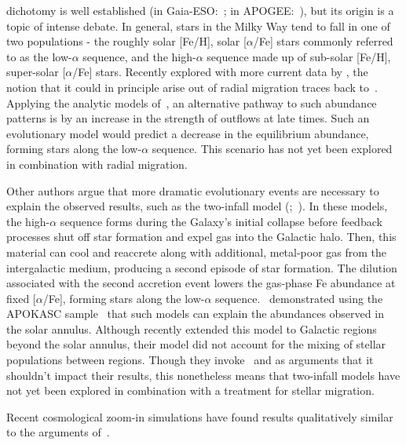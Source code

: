 \documentclass[fleqn, usenatbib]{mnras}
\begin{document}
dichotomy is well established (in Gaia-ESO:~\citealp{Recio-Blanco2014, 
Rojas-Arriagada2017}; in APOGEE:~\citealp{Nidever2014, Hayden2015, 
Weinberg2019}), but its origin is a topic of intense debate. In general, stars 
in the Milky Way tend to fall in one of two populations - the roughly solar 
[Fe/H], solar [$\alpha$/Fe] stars commonly referred to as the low-$\alpha$ 
sequence, and the high-$\alpha$ sequence made up of sub-solar [Fe/H], 
super-solar [$\alpha$/Fe] stars. Recently explored with more current data by 
\citet{Sharma2020}, the notion that it could in principle arise out of radial 
migration traces back to~\citet{Schoenrich2009}. Applying the analytic models 
of~\citet{Weinberg2017}, an alternative pathway to such abundance patterns is 
by an increase in the strength of outflows at late times. Such an evolutionary 
model would predict a decrease in the equilibrium abundance, forming stars 
along the low-$\alpha$ sequence. This scenario has not yet been explored in 
combination with radial migration. 
\par 
Other authors argue that more dramatic evolutionary events are necessary to 
explain the observed results, such as the two-infall model 
(\citealp*{Chiappini1997, Chiappini2001};~\citealp{Romano2010, Grisoni2017, 
Noguchi2018, Palla2020, Spitoni2016, Spitoni2018}). 
In these models, the high-$\alpha$ sequence forms during the Galaxy's initial 
collapse before feedback processes shut off star formation and expel gas into 
the Galactic halo. Then, this material can cool and reaccrete along with 
additional, metal-poor gas from the intergalactic medium, producing a second 
episode of star formation. The dilution associated with the second accretion 
event lowers the gas-phase Fe abundance at fixed [$\alpha$/Fe], forming stars 
along the low-$\alpha$ sequence.~\citet{Spitoni2019a, Spitoni2020} demonstrated 
using the APOKASC sample~\citep{Pinsonneault2014, SilvaAguirre2018} that such 
models can explain the abundances observed in the solar annulus. Although 
\citet{Spitoni2021} recently extended this model to Galactic regions beyond 
the solar annulus, their model did not account for the mixing of stellar 
populations between regions. Though they invoke~\citet{Kubryk2013} and 
\citet{Khoperskov2021} as arguments that it shouldn't impact their results, 
this nonetheless means that two-infall models have not yet been explored in 
combination with a treatment for stellar migration. 
\par 
Recent cosmological zoom-in simulations have found results qualitatively 
similar to the arguments of~\citet{Spitoni2019a, Spitoni2020, Spitoni2021}. 
\end{document}
